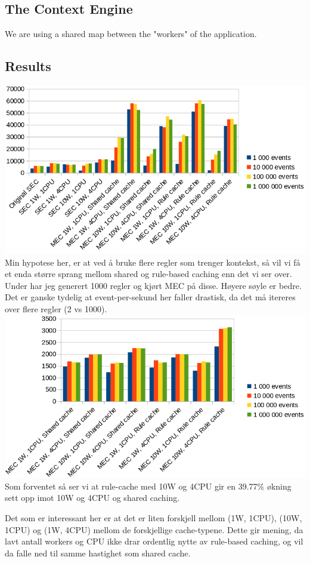 \subsection{The Context Engine}
We are using a shared map between the "workers" of the application.

\subsection{Results}

\includegraphics[scale=0.525]{figures/new-rule-format/performance.png}
\\
Min hypotese her, er at ved å bruke flere regler som trenger kontekst, så vil vi få et enda større sprang mellom shared og rule-based caching enn det vi ser over.
\\
Under har jeg generert 1000 regler og kjørt MEC på disse. Høyere søyle er bedre. Det er ganske tydelig at event-per-sekund her faller drastisk, da det må itereres over flere regler (2 vs 1000).
\includegraphics[scale=0.525]{figures/new-rule-format/performance-2.png}
\\
Som forventet så ser vi at rule-cache med 10W og 4CPU gir en 39.77\% økning sett opp imot 10W og 4CPU og shared caching.

Det som er interessant her er at det er liten forskjell mellom (1W, 1CPU), (10W, 1CPU) og (1W, 4CPU) mellom de forskjellige cache-typene. Dette gir mening, da lavt antall workers og CPU ikke drar ordentlig nytte av rule-based caching, og vil da falle ned til samme hastighet som shared cache.